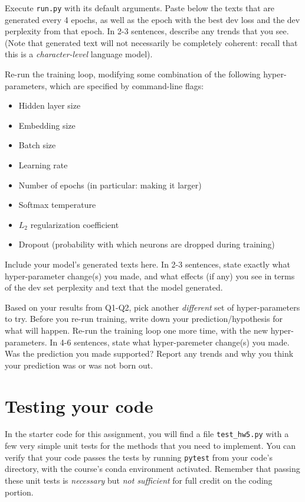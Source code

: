 \documentclass[11pt]{article}
\begin{document}
\vspace{2em}
 Execute \texttt{run.py} with its default arguments.  Paste below the texts that are generated every 4 epochs, as well as the epoch with the best dev loss and the dev perplexity from that epoch. In 2-3 sentences, describe any trends that you see. (Note that generated text will not necessarily be completely coherent: recall that this is a \emph{character-level} language model).

\vspace{2em}
 Re-run the training loop, modifying some combination of the following hyper-parameters, which are specified by command-line flags:
\begin{itemize}
  \item Hidden layer size
  \item Embedding size
  \item Batch size
  \item Learning rate
  \item Number of epochs (in particular: making it larger)
  \item Softmax temperature
  \item $L_2$ regularization coefficient
  \item Dropout (probability with which neurons are dropped during training)
\end{itemize}
Include your model's generated texts here. In 2-3 sentences, state exactly what hyper-parameter change(s) you made, and what effects (if any) you see in terms of the dev set perplexity and text that the model generated.

\vspace{2em}
 Based on your results from Q1-Q2, pick another \textit{different} set of hyper-parameters to try. Before you re-run training, write down your prediction/hypothesis for what will happen. Re-run the training loop one more time, with the new hyper-parameters. In 4-6 sentences, state what hyper-paremeter change(s) you made. Was the prediction you made supported? Report any trends and why you think your prediction was or was not born out.

\section{Testing your code}

In the starter code for this assignment, you will find a file \texttt{test\_hw5.py} with a few very simple unit tests for the methods that you need to implement. You can verify that your code passes the tests by running \texttt{pytest} from your code's directory, with the course's conda environment activated. Remember that passing these unit tests is \textit{necessary} but \textit{not sufficient} for full credit on the coding portion.
\end{document}
